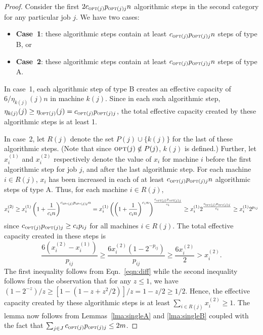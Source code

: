 \documentclass[11pt]{article}
\newcommand{\opt}{{\text{\sc opt}}}
\begin{document}
\begin{proof}
Consider the first $2 c_{\opt (j)} p_{\opt (j)j} n$ algorithmic steps in the second category for any 
particular job $j$. We have two cases: 
\begin{itemize}
\item {\bf Case~1}: these
algorithmic steps contain at least $c_{\opt (j)} p_{\opt (j)j} n$ steps of 
type B, or
\item {\bf Case~2}: these algorithmic steps contain at least
$c_{\opt (j)} p_{\opt (j)j} n$ steps of type A.
\end{itemize} 
In case~1, each algorithmic step of type B creates an effective capacity
of $6/\eta_{k(j)}(j) n$ in machine $k(j)$. Since in each such algorithmic
step, $\eta_{k(j)}(j) \geq \eta_{\opt (j)}(j) = c_{\opt (j)}p_{\opt (j)j}$,
the total effective capacity created by these algorithmic steps is 
at least 1.

In case~2, let $R(j)$ denote the set $P(j)\cup \{k(j)\}$ 
for the last of these algorithmic steps. (Note that since 
$\opt (j)\notin P(j)$, $k(j)$ is defined.) Further, let $x^{(1)}_i$ and
$x^{(2)}_i$ respectively denote 
the value of $x_i$ for machine $i$ before the first
algorithmic step for job $j$, and after the last
algorithmic step. For each machine $i\in R(j)$, $x_i$ has been increased in 
each of at least $c_{\opt (j)} p_{\opt (j)j} n$ algorithmic steps of type A. Thus, for each 
machine $i\in R(j)$,
\begin{equation}
\label{eqn:diff}
x^{(2)}_i 
\geq x^{(1)}_i \left(1 + \frac{1}{c_i n}\right)^{c_{\opt (j)} p_{\opt (j)j} n} 
= x^{(1)}_i \left(\left(1 + \frac{1}{c_i n}\right)^{c_i n}\right)^{\frac{c_{\opt (j)} p_{\opt (j)j}}{c_i}} 
\geq x^{(1)}_i 2^{\frac{c_{\opt (j)} p_{\opt (j)j}}{c_i}} 
\geq x^{(1)}_i 2^{p_{ij}}
\end{equation}
since $c_{\opt (j)} p_{\opt (j)j} \geq c_i p_{ij}$ for all machines $i\in R(j)$. The 
total effective capacity created in these steps is 
\begin{equation*}
\frac{6 (x^{(2)}_i - x^{(1)}_i)}{p_{ij}} 
\geq \frac{6 x^{(2)}_i (1 - 2^{-p_{ij}})}{p_{ij}}
\geq \frac{6 x^{(2)}_i}{2}
> x^{(2)}_i.
\end{equation*}
The first inequality follows from Eqn.~\ref{eqn:diff} while the 
second inequality follows from the observation that for any $z \leq 1$,
we have
$(1 - 2^{-z})/z \geq [1 - (1 - z + z^2/2)]/z = 1 - z/2 \geq 1/2$.
Hence, the effective capacity created by these algorithmic steps is at least
$\sum_{i\in R(j)} x^{(2)}_i \geq 1$. The lemma now follows from
Lemmas~\ref{lma:singleA} and \ref{lma:singleB} coupled with the fact that
$\sum_{j\in J} c_{\opt (j)} p_{\opt (j)j} \leq 2m$.
\end{proof}
\end{document}
